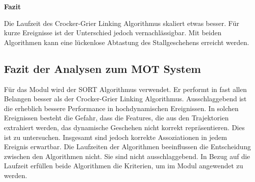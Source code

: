 \textbf{Fazit}\par
Die Laufzeit des Crocker-Grier Linking Algorithmus skaliert etwas besser. Für kurze Ereignisse ist der Unterschied jedoch vernachlässigbar. Mit beiden Algorithmen kann eine lückenlose Abtastung des Stallgeschehens erreicht werden.

\subsection{Fazit der Analysen zum MOT System}
Für das Modul wird der SORT Algorithmus verwendet. Er performt in fast allen Belangen besser als der Crocker-Grier Linking Algorithmus. Ausschlaggebend ist die erheblich bessere Performance in hochdynamischen Ereignissen. In solchen Ereignissen besteht die Gefahr, dass die Features, die aus den Trajektorien extrahiert werden, das dynamische Geschehen nicht korrekt repräsentieren. Dies ist zu untersuchen. Insgesamt sind jedoch korrekte Assoziationen in jedem Ereignis erwartbar. Die Laufzeiten der Algorithmen beeinflussen die Entscheidung zwischen den Algorithmen nicht. Sie sind nicht ausschlaggebend. In Bezug auf die Laufzeit erfüllen beide Algorithmen die Kriterien, um im Modul angewendet zu werden. 